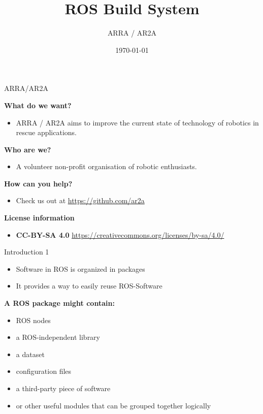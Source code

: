 \documentclass{beamer}
\title[]{ROS Build System} %
\author{ARRA / AR2A} %
\institute %
{
\textbf{A}dvancements for \textbf{R}obotics in \textbf{R}escue \textbf{A}pplications
}
\date{\today} %
\begin{document}
\begin{frame}
\titlepage
\end{frame}
\begin{frame}
\tableofcontents
\end{frame}
\begin{frame}{ARRA/AR2A}
\begin{large}\textbf{What do we want?}\end{large}
\begin{itemize}
 \item ARRA / AR2A aims to improve the current state of technology of robotics in rescue applications.
\end{itemize}
\begin{large}\textbf{Who are we?}\end{large}
\begin{itemize}
 \item A volunteer non-profit organisation of robotic enthusiasts.
\end{itemize}
\begin{large}\textbf{How can you help?}\end{large}
\begin{itemize}
 \item Check us out at \url{https://github.com/ar2a}
\end{itemize}
 \vspace{1cm}
\begin{large}\textbf{License information}\end{large}
\begin{itemize}
 \item \textbf{CC-BY-SA 4.0} \url{https://creativecommons.org/licenses/by-sa/4.0/}
\end{itemize}
\end{frame}
\begin{frame}{Introduction 1}
 \begin{itemize}
 \item Software in ROS is organized in packages
 \item It provides a way to easily reuse ROS-Software
 \end{itemize}
 \vspace{1cm}
 \textbf{A ROS package might contain:}
 \begin{itemize}
 \item ROS nodes
 \item  a ROS-independent library
 \item a dataset
 \item configuration files
 \item a third-party piece of software
 \item or other useful modules that can be grouped together logically
 \end{itemize}
\end{frame}
\end{document}
